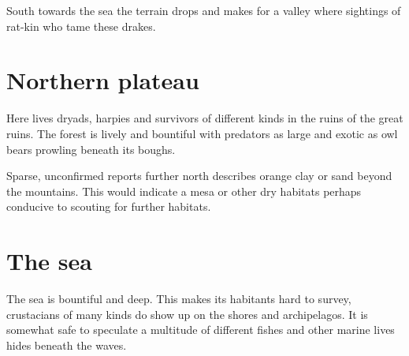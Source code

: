 \documentclass{article}
\begin{document}
    South towards the sea the terrain drops and makes for a valley where sightings of rat-kin who tame these drakes. 

    \section*{Northern plateau}

    Here lives dryads, harpies and survivors of different kinds in the ruins of the great ruins. The forest is lively and bountiful with predators as large and exotic as owl bears prowling beneath its boughs.

    Sparse, unconfirmed reports further north describes orange clay or sand beyond the mountains. This would indicate a mesa or other dry habitats perhaps conducive to scouting for further habitats.

    \section*{The sea}

    The sea is bountiful and deep. This makes its habitants hard to survey, crustacians of many kinds do show up on the shores and archipelagos. It is somewhat safe to speculate a multitude of different fishes and other marine lives hides beneath the waves.
    
\end{document}
